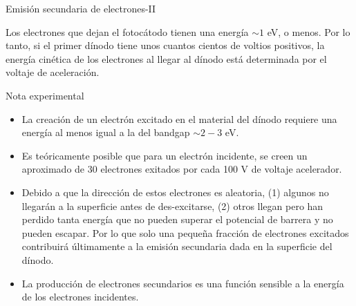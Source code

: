 \documentclass[a4paper,10pt]{beamer}
\begin{document}
  
\begin{frame}{Emisión secundaria de electrones-II}

  \begin{justify}
 \begin{footnotesize}Los electrones que dejan el fotocátodo tienen una energía $\sim 1$ eV, o menos. 
 Por lo tanto, si el primer dínodo tiene unos cuantos cientos de voltios positivos, 
 la energía cinética de los electrones al llegar al dínodo está determinada por 
 el voltaje de aceleración. \end{footnotesize}
 \end{justify}
 
  \begin{exampleblock}{Nota experimental}
  \begin{footnotesize}
  \begin{itemize}[<+->]
   \item \begin{justify}
          La creación de un electrón excitado en el material del dínodo requiere una
          energía al menos igual a la del bandgap $\sim 2-3$ eV.
         \end{justify}
   \item \begin{justify}
          Es teóricamente posible que para un electrón incidente, se creen un 
          aproximado de 30 electrones exitados por cada 100 V de voltaje acelerador.
         \end{justify}
   \item \begin{justify}
          Debido a que la dirección de estos electrones es aleatoria, (1) algunos 
          no llegarán a la superficie antes de des-excitarse, (2) otros llegan 
          pero han perdido tanta energía que no pueden superar el potencial de barrera
          y no pueden escapar. Por lo que solo una pequeña fracción de electrones 
          excitados contribuirá últimamente a la emisión secundaria dada en la 
          superficie del dínodo.
         \end{justify}
   \item \begin{justify}
          La producción de electrones secundarios es una función sensible a la 
          energía de los electrones incidentes.
         \end{justify}

  \end{itemize}  
  \end{footnotesize}
 \end{exampleblock}
\end{frame}
\end{document}
